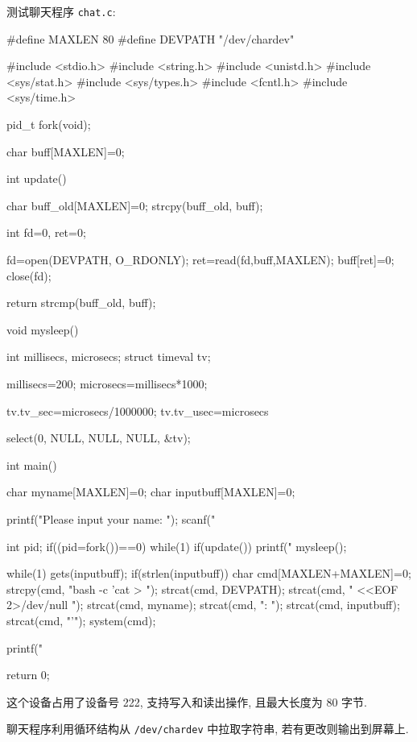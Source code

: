 \documentclass[11pt]{report}
\begin{document}
        测试聊天程序 \verb|chat.c|:

\begin{consolelong}
#define MAXLEN 80
#define DEVPATH "/dev/chardev"

#include <stdio.h>
#include <string.h>
#include <unistd.h>
#include <sys/stat.h>
#include <sys/types.h>
#include <fcntl.h>
#include <sys/time.h>

pid_t fork(void);

char buff[MAXLEN]={0};

int update(){
    char buff_old[MAXLEN]={0};
    strcpy(buff_old, buff);

    int fd=0, ret=0;
    
    fd=open(DEVPATH, O_RDONLY);
    ret=read(fd,buff,MAXLEN);
    buff[ret]=0;
    close(fd);

    return strcmp(buff_old, buff);
}

void mysleep(){
    int millisecs, microsecs;
    struct timeval tv;

    millisecs=200;
    microsecs=millisecs*1000;

    tv.tv_sec=microsecs/1000000;
    tv.tv_usec=microsecs%

    select(0, NULL, NULL, NULL, &tv);
}

int main(){

    char myname[MAXLEN]={0};
    char inputbuff[MAXLEN]={0};

    printf("Please input your name: ");
    scanf("%

    int pid;
    if((pid=fork())==0){   
        while(1){
            if(update()){
                printf("%
            }
            mysleep();
        }
    }

    while(1){
        gets(inputbuff);
        if(strlen(inputbuff)){
            char cmd[MAXLEN+MAXLEN]={0};
            strcpy(cmd, "bash -c 'cat > ");
            strcat(cmd, DEVPATH);
            strcat(cmd, " <<EOF 2>/dev/null \n");
            strcat(cmd, myname);
            strcat(cmd, ": ");
            strcat(cmd, inputbuff);
            strcat(cmd, "\nEOF'");
            system(cmd);
        }
    }

    printf("%

    return 0;
}
\end{consolelong}

        这个设备占用了设备号 222, 支持写入和读出操作, 且最大长度为 80 字节.

        聊天程序利用循环结构从 \verb|/dev/chardev| 中拉取字符串, 若有更改则输出到屏幕上. 
\end{document}
